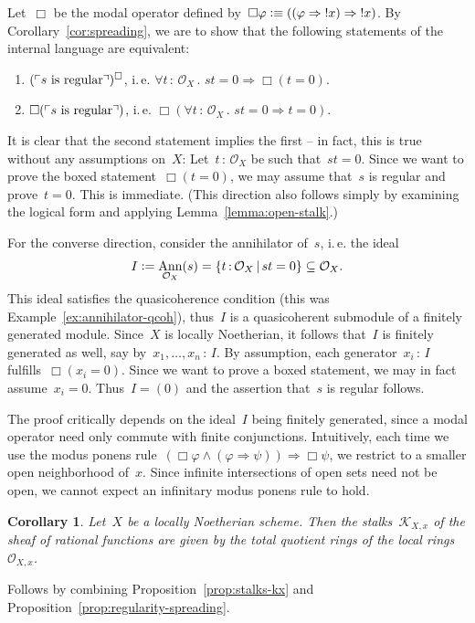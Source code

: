 \documentclass[10pt,reqno,a4paper]{amsbook}
\makeatletter
\theoremstyle{definition}
\theoremstyle{plain}
\newtheorem{cor}[defn]{Corollary}
\theoremstyle{remark}
\renewcommand{\O}{\mathcal{O}}
\newcommand{\K}{\mathcal{K}}
\DeclareMathOperator{\Ann}{Ann}
\newcommand{\?}{\,{:}\,}
\renewcommand{\_}{\mathpunct{.}\,}
\newcommand{\speak}[1]{\ulcorner\text{\textnormal{#1}}\urcorner}
\newcommand{\ie}{i.\,e.\@\xspace}
\newcommand{\defeq}{\vcentcolon=}
\newcommand{\defequiv}{\vcentcolon\equiv}
\renewenvironment{proof}[1][\proofname]{\par
  \pushQED{\qed}%
  \normalfont \topsep6\p@\@plus6\p@\relax
  \trivlist
  \item[\hskip\labelsep
        \itshape
    #1\@addpunct{.}]\ignorespaces
}{%
  \popQED\endtrivlist\@endpefalse
}
\makeatother
\begin{document}
\begin{proof}
Let~$\Box$ be the modal operator defined by~$\Box\varphi \defequiv ((\varphi
\Rightarrow {!x}) \Rightarrow {!x})$. By Corollary~\ref{cor:spreading}, we are
to show that the following statements of the internal language are equivalent:
\begin{enumerate}
\item $(\speak{$s$ is regular})^\Box$, \ie
$\forall t\?\O_X\_ st = 0 \Rightarrow \Box(t = 0)$.
\item $\Box(\speak{$s$ is regular})$, \ie
$\Box(\forall t\?\O_X\_ st = 0 \Rightarrow t = 0)$.
\end{enumerate}
It is clear that the second statement implies the first -- in fact, this is true
without any assumptions on~$X$: Let~$t\?\O_X$ be such that~$st = 0$. Since we want to
prove the boxed statement~$\Box(t=0)$, we may assume that~$s$ is regular and
prove~$t = 0$. This is immediate. (This direction also follows simply by
examining the logical form and applying Lemma~\ref{lemma:open-stalk}.)

For the converse direction, consider the annihilator of~$s$, \ie the ideal
\[ I \defeq \Ann_{\O_X}(s) = \{ t\?\O_X \,|\, st = 0 \} \subseteq \O_X. \]
This ideal satisfies the quasicoherence condition (this was Example~\ref{ex:annihilator-qcoh}),
thus~$I$ is a quasicoherent submodule of a finitely generated module. Since~$X$ is
locally Noetherian, it follows that~$I$ is finitely generated as well, say by~$x_1,\ldots,x_n \? I$. By
assumption, each generator~$x_i \? I$ fulfills~$\Box(x_i = 0)$. Since we want
to prove a boxed statement, we may in fact assume~$x_i = 0$. Thus~$I = (0)$ and
the assertion that~$s$ is regular follows.
\end{proof}

The proof critically depends on the ideal~$I$ being finitely
generated, since a modal operator need only commute with finite
conjunctions. Intuitively, each time we use the modus ponens rule~$(\Box\varphi \wedge
(\varphi \Rightarrow \psi)) \Rightarrow \Box\psi$, we restrict to a smaller open
neighborhood of~$x$. Since infinite intersections of open sets need not be
open, we cannot expect an infinitary modus ponens rule to hold.

\begin{cor}Let~$X$ be a locally Noetherian scheme. Then the stalks~$\K_{X,x}$
of the sheaf of rational functions are given by the total quotient rings of the
local rings~$\O_{X,x}$.\end{cor}
\begin{proof}Follows by combining Proposition~\ref{prop:stalks-kx} and
Proposition~\ref{prop:regularity-spreading}.\end{proof}
\end{document}
